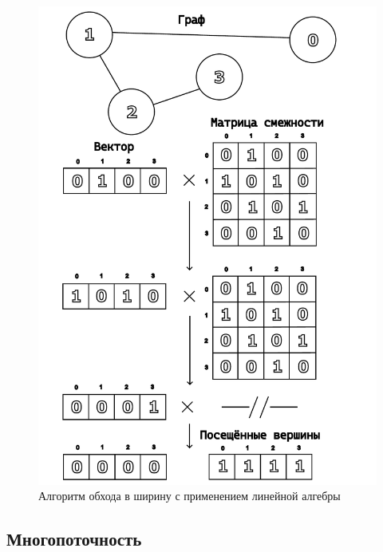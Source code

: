 \begin{figure}[H]
    \centering
    \includegraphics[width=\textwidth]{figures/linear_bfs.pdf}
    \caption{Алгоритм обхода в ширину с применением линейной алгебры}
    \label{fig:linearbfs}
\end{figure}

\subsection{Многопоточность}

